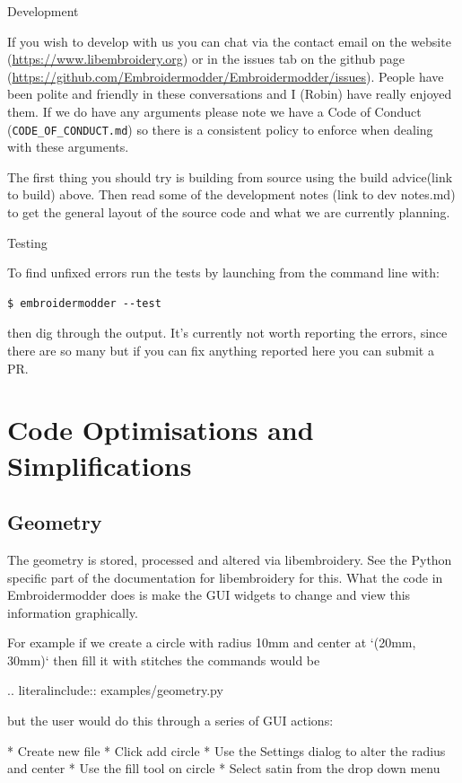 \documentclass[a4paper]{report}
\begin{document}
Development
~~~~~~~~~~~

If you wish to develop with us you can chat via the contact email on the
website (\url{https://www.libembroidery.org}) or in the issues tab on the
github page (\url{https://github.com/Embroidermodder/Embroidermodder/issues}).
People have been polite and friendly in these conversations and I (Robin) have
really enjoyed them. If we do have any arguments please note we have a Code of
Conduct (\texttt{CODE\_OF\_CONDUCT.md}) so there is a consistent policy to enforce when
dealing with these arguments.

The first thing you should try is building from source using the build advice(link to build)
above. Then read some of the development notes (link to dev notes.md) to get the general
layout of the source code and what we are currently planning.

Testing
~~~~~~~

To find unfixed errors run the tests by launching from the command line with:

\begin{lstlisting}
$ embroidermodder --test
\end{lstlisting}

then dig through the output. It's currently not worth reporting the errors, since
there are so many but if you can fix anything reported here you can submit a PR.

\section{Code Optimisations and Simplifications}

\subsection{Geometry}

The geometry is stored, processed and altered via libembroidery. See the Python specific part
of the documentation for libembroidery for this. What the code in Embroidermodder does is make
the GUI widgets to change and view this information graphically.

For example if we create a circle with radius 10mm and center at `(20mm, 30mm)` then fill it
with stitches the commands would be

.. literalinclude:: examples/geometry.py

but the user would do this through a series of GUI actions:

* Create new file
* Click add circle
* Use the Settings dialog to alter the radius and center
* Use the fill tool on circle
* Select satin from the drop down menu
\end{document}
